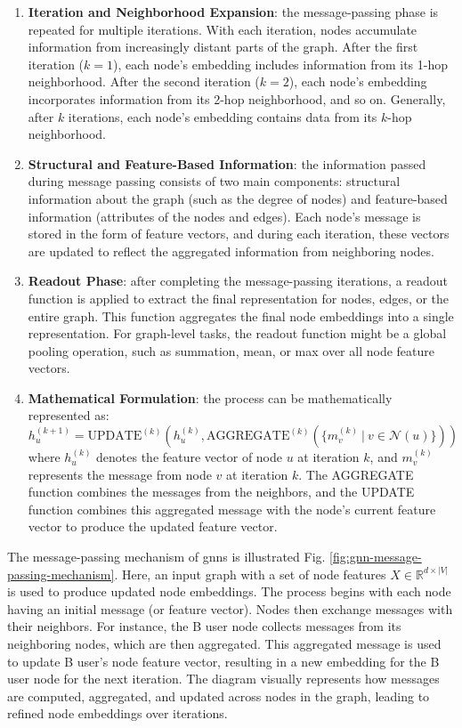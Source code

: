 \begin{enumerate}
    \item \textbf{Iteration and Neighborhood Expansion}: the message-passing phase is repeated for multiple iterations. With each iteration, nodes accumulate information from increasingly distant parts of the graph. After the first iteration (\(k=1\)), each node’s embedding includes information from its 1-hop neighborhood. After the second iteration (\(k=2\)), each node’s embedding incorporates information from its 2-hop neighborhood, and so on. Generally, after \(k\) iterations, each node’s embedding contains data from its \(k\)-hop neighborhood.

    \item \textbf{Structural and Feature-Based Information}: the information passed during message passing consists of two main components: structural information about the graph (such as the degree of nodes) and feature-based information (attributes of the nodes and edges). Each node's message is stored in the form of feature vectors, and during each iteration, these vectors are updated to reflect the aggregated information from neighboring nodes.

    \item \textbf{Readout Phase}: after completing the message-passing iterations, a readout function is applied to extract the final representation for nodes, edges, or the entire graph. This function aggregates the final node embeddings into a single representation. For graph-level tasks, the readout function might be a global pooling operation, such as summation, mean, or max over all node feature vectors.

    \item \textbf{Mathematical Formulation}: the process can be mathematically represented as:
   \[
   h_u^{(k+1)} = \text{UPDATE}^{(k)}\left(h_u^{(k)}, \text{AGGREGATE}^{(k)}\left(\{m_{v}^{(k)}~|~v \in \mathcal{N}(u)\}\right)\right)
   \]
   where \(h_u^{(k)}\) denotes the feature vector of node \(u\) at iteration \(k\), and \(m_{v}^{(k)}\) represents the message from node \(v\) at iteration \(k\). The AGGREGATE function combines the messages from the neighbors, and the UPDATE function combines this aggregated message with the node’s current feature vector to produce the updated feature vector.


\end{enumerate}

The message-passing mechanism of \glspl{gnn} is illustrated Fig. \ref{fig:gnn-message-passing-mechanism}.
Here, an input graph with a set of node features \(X \in \mathbb{R}^{d \times |V|}\) is used to produce updated node embeddings.
The process begins with each node having an initial message (or feature vector).
Nodes then exchange messages with their neighbors. For instance, the B user node collects messages from its neighboring nodes, which are then aggregated.
This aggregated message is used to update B user's node feature vector, resulting in a new embedding for the B user node for the next iteration.
The diagram visually represents how messages are computed, aggregated, and updated across nodes in the graph, leading to refined node embeddings over iterations.

